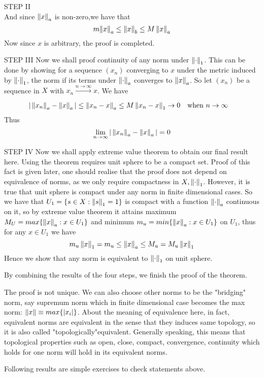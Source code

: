 \documentclass{article}
\begin{document}
\begin{theorem}
\begin{pf}{STEP II}{}
$$		$$
		And since ${\left\|{x}\right\|_a}$ is non-zero,we have that
		$$
			m{\left\|{x}\right\|_a}\leq \left\|{x}\right\|_b\leq M\left\|{x}\right\|_a
		$$
		Now since $x$ is arbitrary, the proof is completed.	
	\end{pf}
	\begin{pf}{STEP III}{}
		Now we shall proof continuity of any norm under $\left\|{\cdot}\right\| _1$. This can be done by showing for a sequence $(x_n)$ converging to $x$ under the metric induced by $\left\|{\cdot}\right\|_1$, the norm if its terms under $\left\|{\cdot}\right\|_a$ converges to $\left\|{x}\right\|_a$. So let $(x_n)$ be a sequence in $X$ with $x_n\xrightarrow[]{n\to \infty}x$. We have
		\begin{equation}
			\begin{split}\nonumber
				|\left\|{x_n}\right\|_a-\left\|{x}\right\|_a|&\leq\left\|{x_n-x}\right\|_a\leq M\left\|{x_n-x}\right\|_1\to0\quad \text{when}\,\,n\to\infty
			\end{split}
		\end{equation}
		Thus
		$$
			\lim_{n\to\infty}|\left\|{x_n}\right\|_a-\left\|{x}\right\|_a|=0
		$$
	\end{pf}
\begin{pf}{STEP IV}{}
	Now we shall apply extreme value theorem to obtain our final result here. Using the theorem requires unit sphere to be a compact set. Proof of this fact is given later, one should realise that the proof does not depend on equivalence of norms, as we only require compactness in $X,\left\|{\cdot}\right\|_1$. However, it is true that unit sphere is compact under any norm in finite dimensional cases. So we have that $U_1=\{s\in X:\left\|{s}\right\|_1=1\}$ is compact with  a  function $\left\|{\cdot}\right\|_a$ continuous on it, so by extreme value theorem it attains maximum $M_U=max\{\left\|{x}\right\|_a:x\in U_1\}$ and minimum $m_u=min\{\left\|{x}\right\|_a:x\in U_1\}$ on $U_1$, thus for any $x\in U_1$ we have
	$$
		m_u \left\|{x}\right\|_1=m_u\leq\left\|{x}\right\|_a\leq M_u=M_u \left\|{x}\right\|_1
	$$
	Hence we show that any norm is equivalent to $\left\|{\cdot}\right\|_1$ on unit sphere.
\end{pf}
By combining the results of the four steps, we finish the proof of the theorem.
\end{theorem}

\begin{remark}\rm\nextline
	The proof is not unique. We can also choose other norms to be the "bridging" norm, say supremum norm which in finite dimensional case becomes the max norm: $\left\|{x}\right\|\equiv max\{|x_i|\}$. About the meaning of equivalence here, in fact, equivalent norms are equivalent in the sense that they induces same topology, so it is also called "topologically"equivalent. Generally speaking, this means that topological properties such as open, close, compact, convergence, continuity which holds for one norm will hold in its equivalent norms.
\end{remark}
Following results are simple exercises to check statements above.
\end{document}

